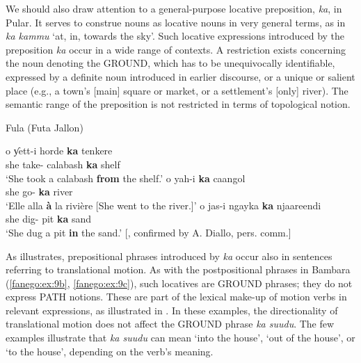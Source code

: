 \documentclass[output=paper]{langscibook}
\begin{document}
We should also draw attention to a general-purpose locative preposition, \textit{ka}, in Pular. It serves to construe nouns as locative nouns in very general terms, as in \textit{ka kammu} ‘at, in, towards the sky’. Such locative expressions introduced by the preposition \textit{ka} occur in a wide range of contexts. A restriction exists concerning the noun denoting the GROUND, which has to be unequivocally identifiable, expressed by a definite noun introduced in earlier discourse, or a unique or salient place (e.g., a town’s [main] square or market, or a settlement’s [only] river). The semantic range of the preposition is not restricted in terms of topological notion. 

\begin{exe}
    \ex\label{fanego:ex:10} Fula (Futa Jallon)
    \begin{xlist}
        \ex\label{fanego:ex:10a} 
        \gll o {ƴett-i\footnotemark} horde \textbf{ka} tenkere \\
        she take-\PFV{} calabash \textbf{ka} shelf \\
        \glt ‘She took a calabash \textbf{from} the shelf.’
        \ex\label{fanego:ex:10b} 
        \gll o yah-i \textbf{ka} caangol \\
        she go-\PFV{} \textbf{ka} river \\
        \glt ‘Elle alla \textbf{à} la rivière [She went to the river.]’
        \ex\label{fanego:ex:10c} 
        \gll o jas-i ngayka \textbf{ka} njaareendi \\
        she dig-\PFV{} pit \textbf{ka} sand \\
        \glt ‘She dug a pit \textbf{in} the sand.’ [\citealt[84]{labatut_initiation_nodate}, confirmed by A. Diallo, pers. comm.]
    \end{xlist}
\end{exe}

\noindent
As  illustrates, prepositional phrases introduced by \textit{ka} occur also in sentences referring to translational motion. As with the postpositional phrases in Bambara (\ref{fanego:ex:9b}, \ref{fanego:ex:9c}), such locatives are GROUND phrases; they do not express PATH notions. These are part of the lexical make-up of motion verbs in relevant expressions, as illustrated in . In these examples, the directionality of translational motion does not affect the GROUND phrase \textit{ka suudu}. The few examples illustrate that \textit{ka suudu} can mean ‘into the house’, ‘out of the house’, or ‘to the house’, depending on the verb’s meaning.
\end{document}

